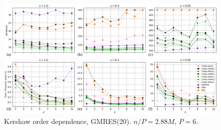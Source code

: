 \begin{frame}
  \begin{figure}
    \centering
    \includegraphics[width=\textwidth]{../figs/kershaw-order-scaling.png}
    \vspace*{-0.8cm}
    \captionsetup{labelformat=empty}
    \caption{
      \small
      Kershaw order dependence, GMRES(20).
      $n/P = 2.88M$, $P=6$.
      \label{fig:kershaw-order-dependence}
    }
  \end{figure}
\end{frame}